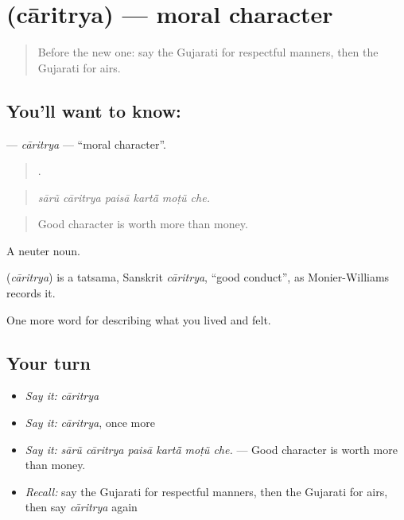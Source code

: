 \section[\texorpdfstring{\gu{ચારિત્ર્ય} (cāritrya)}{ચારિત્ર્ય (cāritrya)}]{ (cāritrya) — moral character}

\label{lesson:GU-C467-caritrya}



\begin{quote}
Before the new one: say the Gujarati for respectful manners, then the Gujarati for airs.
\end{quote}

\subsection*{You'll want to know: }
\textbf{} — \emph{cāritrya} — \textquotedblleft{}moral character\textquotedblright{}.

\begin{quote}
     .
\end{quote}

\begin{quote}
\emph{sārũ cāritrya paisā kartā̃ moṭũ che.}
\end{quote}

\begin{quote}
Good character is worth more than money.
\end{quote}

A neuter noun.

\begin{cousinweb}
\textbf{} (\emph{cāritrya}) is a tatsama, Sanskrit \emph{cāritrya}, \textquotedblleft{}good conduct\textquotedblright{}, as Monier-Williams records it.
\end{cousinweb}

\begin{grammarlens}[title={What you've built}]
One more word for describing what you lived and felt.
\end{grammarlens}

\subsection*{Your turn}
\begin{itemize}
\raggedright
  \item \emph{Say it:} \emph{cāritrya}
  \item \emph{Say it:} \emph{cāritrya}, once more
  \item \emph{Say it:} \emph{sārũ cāritrya paisā kartā̃ moṭũ che.} — Good character is worth more than money.
  \item \emph{Recall:} say the Gujarati for respectful manners, then the Gujarati for airs, then say \emph{cāritrya} again
\end{itemize}

